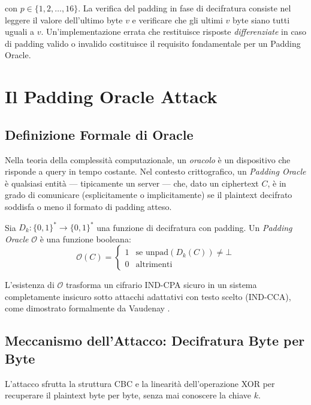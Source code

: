 \documentclass[12pt,a4paper]{article}
\begin{document}
con $p \in \{1, 2, \ldots, 16\}$. La verifica del padding in fase di decifratura consiste
nel leggere il valore dell'ultimo byte $v$ e verificare che gli ultimi $v$ byte siano tutti
uguali a $v$. Un'implementazione errata che restituisce risposte \emph{differenziate} in
caso di padding valido o invalido costituisce il requisito fondamentale per un Padding Oracle.

\section{Il Padding Oracle Attack}

\subsection{Definizione Formale di Oracle}

Nella teoria della complessità computazionale, un \emph{oracolo} è un dispositivo che risponde
a query in tempo costante. Nel contesto crittografico, un \emph{Padding Oracle} è qualsiasi
entità — tipicamente un server — che, dato un ciphertext $C$, è in grado di comunicare
(esplicitamente o implicitamente) se il plaintext decifrato soddisfa o meno il formato di
padding atteso.

\begin{definition}
Sia $D_k : \{0,1\}^* \to \{0,1\}^*$ una funzione di decifratura con padding. Un
\emph{Padding Oracle} $\mathcal{O}$ è una funzione booleana:
\[
  \mathcal{O}(C) = \begin{cases} 1 & \text{se } \mathrm{unpad}(D_k(C)) \neq \bot \\ 0 & \text{altrimenti} \end{cases}
\]
\end{definition}

L'esistenza di $\mathcal{O}$ trasforma un cifrario IND-CPA sicuro in un sistema completamente
insicuro sotto attacchi adattativi con testo scelto (IND-CCA), come dimostrato formalmente
da Vaudenay \cite{vaudenay2002}.

\subsection{Meccanismo dell'Attacco: Decifratura Byte per Byte}

L'attacco sfrutta la struttura CBC e la linearità dell'operazione XOR per recuperare il
plaintext byte per byte, senza mai conoscere la chiave $k$.
\end{document}
